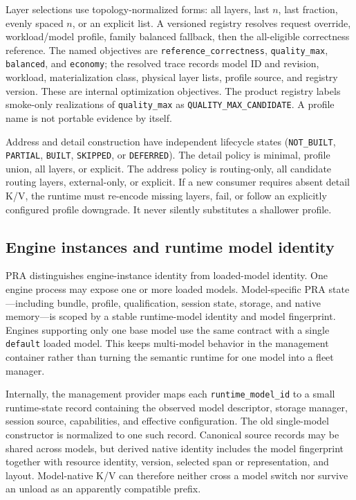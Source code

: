 \documentclass[11pt]{article}
\newcommand{\QualityMaxCandidate}{\texttt{QUALITY\_\allowbreak MAX\_\allowbreak CANDIDATE}}
\begin{document}
Layer selections use topology-normalized forms: all layers, last $n$, last
fraction, evenly spaced $n$, or an explicit list. A versioned registry resolves
request override, workload/model profile, family balanced fallback, then the
all-eligible correctness reference. The named objectives are
\texttt{reference\_correctness}, \texttt{quality\_max}, \texttt{balanced}, and
\texttt{economy}; the resolved trace records model ID and revision, workload,
materialization class, physical layer lists, profile source, and registry
version. These are internal optimization objectives. The product registry
labels smoke-only realizations of \texttt{quality\_max} as
\QualityMaxCandidate. A profile name is not portable evidence by
itself.

Address and detail construction have independent lifecycle states
(\texttt{NOT\_BUILT}, \texttt{PARTIAL}, \texttt{BUILT}, \texttt{SKIPPED}, or
\texttt{DEFERRED}). The detail policy is minimal, profile union, all layers, or
explicit. The address policy is routing-only, all candidate routing layers,
external-only, or explicit. If a new consumer requires absent detail K/V, the
runtime must re-encode missing layers, fail, or follow an explicitly configured
profile downgrade. It never silently substitutes a shallower profile.

\subsection{Engine instances and runtime model identity}

PRA distinguishes engine-instance identity from loaded-model identity. One
engine process may expose one or more loaded models. Model-specific PRA
state---including bundle, profile, qualification, session state, storage, and
native memory---is scoped by a stable runtime-model identity and model
fingerprint. Engines supporting only one base model use the same contract with
a single \texttt{default} loaded model. This keeps multi-model behavior in the
management container rather than turning the semantic runtime for one model
into a fleet manager.

Internally, the management provider maps each \texttt{runtime\_model\_id} to a
small runtime-state record containing the observed model descriptor, storage
manager, session source, capabilities, and effective configuration. The old
single-model constructor is normalized to one such record. Canonical source
records may be shared across models, but derived native identity includes the
model fingerprint together with resource identity, version, selected span or
representation, and layout. Model-native K/V can therefore neither cross a
model switch nor survive an unload as an apparently compatible prefix.
\end{document}
